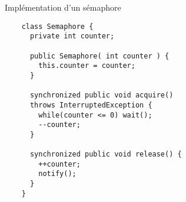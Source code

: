 
\begingroup

\begin{frame}[fragile]{Implémentation d'un sémaphore}
  
  \begin{lstlisting}
    class Semaphore {
      private int counter;
      
      public Semaphore( int counter ) {
        this.counter = counter;
      }
      
      synchronized public void acquire()
      throws InterruptedException {
        while(counter <= 0) wait();
        --counter;
      }
      
      synchronized public void release() {
        ++counter;
        notify();
      }
    }
  \end{lstlisting}
\end{frame}

\endgroup
\endinput
